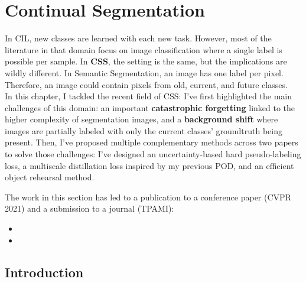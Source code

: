 \chapter{Continual Segmentation}
\label{chapter:segmentation}

\begin{chapabstract}
    In \acf{CIL}, new classes are learned with each new task. However, most of the literature in
    that domain focus on image classification where a single label is possible per sample. In
    \textbf{\acf{CSS}}, the setting is the same, but the implications are wildly different. In Semantic
    Segmentation, an image has one label per pixel. Therefore, an image could contain pixels from
    old, current, and future classes.
    \\
    In this chapter, I tackled the recent field of \acf{CSS}: I've first highlighted the main
    challenges of this domain: an important \textbf{catastrophic forgetting} linked to the higher complexity
    of segmentation images, and a \textbf{background shift} where images are partially labeled with
    only the current classes' groundtruth being present. Then, I've proposed multiple complementary
    methods across two papers to solve those challenges: I've designed an uncertainty-based
    hard pseudo-labeling loss, a multiscale distillation loss inspired by my previous POD, and
    an efficient object rehearsal method.

    The work in this section has led to a publication to a conference paper (CVPR 2021) and a submission
    to a journal (TPAMI):

    \begin{itemize}
        \item {}
        \item {}
    \end{itemize}

\end{chapabstract}
\newpage

\minitoc
{}



\section{Introduction}
\label{sec:seg_intro}

